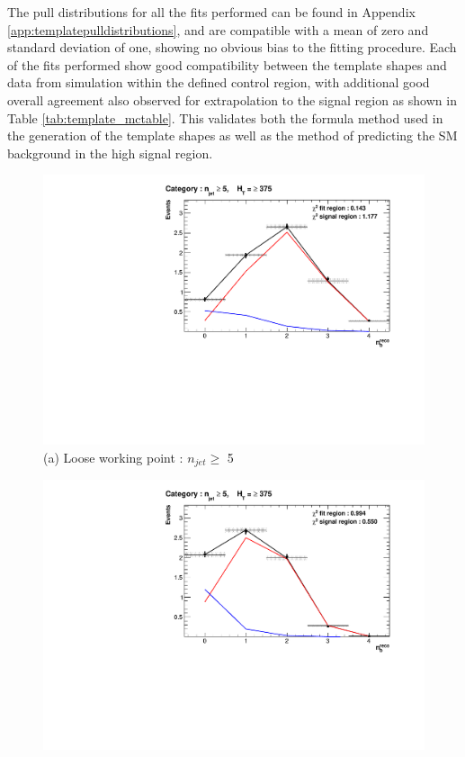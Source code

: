 The pull distributions for all the fits performed can be found in Appendix \ref{app:templatepulldistributions}, and are compatible with a mean of zero and standard deviation of one, showing no obvious bias to the fitting procedure. Each of the fits performed show good compatibility between the template shapes and data from simulation within the defined control region, with additional good overall agreement also observed for extrapolation to the signal region as shown in Table \ref{tab:template_mctable}. This validates both the formula method used in the generation of the template shapes as well as the method of predicting the \ac{SM} background in the high \nbreco signal region. 

\begin{figure}[ht]
\footnotesize
\vspace{5mm}
\centering
\begin{minipage}{.51\textwidth}
\centering
\includegraphics[width = 1.0\linewidth]{plots/ThesisPlots/Final_Fit_To_MC_Normal_Loose_HTBin_OneMuon_Template_375_jet_mult_5.pdf}
\centering (a) Loose working point : $n_{jet} \geq$  5 
\end{minipage}
\quad
\begin{minipage}[b]{0.51\linewidth}
\includegraphics[width = 1.0\linewidth]{plots/ThesisPlots/Final_Fit_To_MC_Normal_Medium_HTBin_OneMuon_Template_375_jet_mult_5.pdf}

\end{minipage}
\end{figure}
